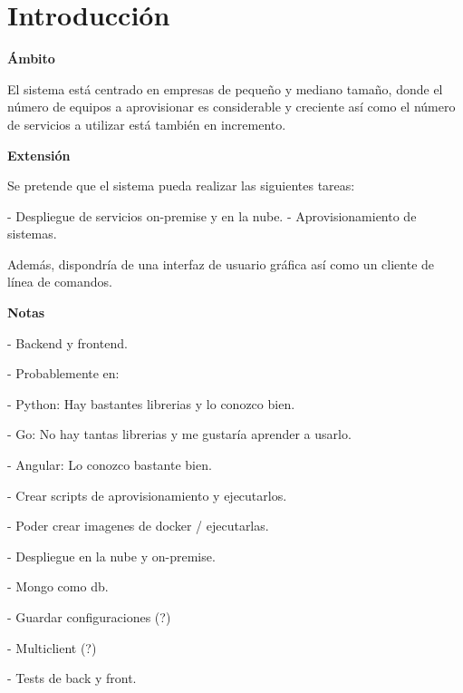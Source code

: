 \chapter{Introducción}


\textbf{Ámbito}
\vspace{0,2cm}

El sistema está centrado en empresas de pequeño y mediano tamaño, donde el número de equipos a aprovisionar es considerable y creciente así como el número de servicios a utilizar está también en incremento.


\vspace{1cm}


\textbf{Extensión}
\vspace{0,2cm}

Se pretende que el sistema pueda realizar las siguientes tareas:

- Despliegue de servicios on-premise y en la nube.
- Aprovisionamiento de sistemas.

Además, dispondría de una interfaz de usuario gráfica así como un cliente de línea de comandos.


\vspace{1cm}


\textbf{Notas}
\vspace{0,2cm}

- Backend y frontend.

- Probablemente en:

\hspace{1cm}- Python: Hay bastantes librerias y lo conozco bien.

\hspace{1cm}- Go: No hay tantas librerias y me gustaría aprender a usarlo.

\hspace{1cm}- Angular: Lo conozco bastante bien.

- Crear scripts de aprovisionamiento y ejecutarlos.

- Poder crear imagenes de docker / ejecutarlas.

- Despliegue en la nube y on-premise.

- Mongo como db.

- Guardar configuraciones (?)

- Multiclient (?)

- Tests de back y front.
